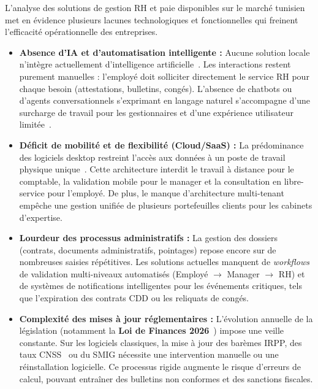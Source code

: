 \renewcommand{\arraystretch}{1.0}

L'analyse des solutions de gestion RH et paie disponibles sur le marché tunisien met en évidence plusieurs lacunes technologiques et fonctionnelles qui freinent l'efficacité opérationnelle des entreprises.

\begin{itemize}[label=\textbullet, leftmargin=1.5cm]
    \item \textbf{Absence d'IA et d'automatisation intelligente :}
    Aucune solution locale n'intègre actuellement d'intelligence artificielle~\cite{llm_survey}. Les interactions restent purement manuelles : l'employé doit solliciter directement le service RH pour chaque besoin (attestations, bulletins, congés). L'absence de chatbots ou d'agents conversationnels s'exprimant en langage naturel s'accompagne d'une surcharge de travail pour les gestionnaires et d'une expérience utilisateur limitée~\cite{chatbot_hr}.

    \item \textbf{Déficit de mobilité et de flexibilité (Cloud/SaaS) :}
    La prédominance des logiciels desktop restreint l'accès aux données à un poste de travail physique unique~\cite{saas}. Cette architecture interdit le travail à distance pour le comptable, la validation mobile pour le manager et la consultation en libre-service pour l'employé. De plus, le manque d'architecture multi-tenant~\cite{multitenant} empêche une gestion unifiée de plusieurs portefeuilles clients pour les cabinets d'expertise.

    \item \textbf{Lourdeur des processus administratifs :}
    La gestion des dossiers (contrats, documents administratifs, pointages) repose encore sur de nombreuses saisies répétitives. Les solutions actuelles manquent de \textit{workflows} de validation multi-niveaux automatisés (Employé $\rightarrow$ Manager $\rightarrow$ RH) et de systèmes de notifications intelligentes pour les événements critiques, tels que l'expiration des contrats CDD ou les reliquats de congés.

    \item \textbf{Complexité des mises à jour réglementaires :}
    L'évolution annuelle de la législation (notamment la \textbf{Loi de Finances 2026}~\cite{loifinance}) impose une veille constante. Sur les logiciels classiques, la mise à jour des barèmes IRPP, des taux CNSS~\cite{cnss_reg} ou du SMIG nécessite une intervention manuelle ou une réinstallation logicielle. Ce processus rigide augmente le risque d'erreurs de calcul, pouvant entraîner des bulletins non conformes et des sanctions fiscales.
\end{itemize}

